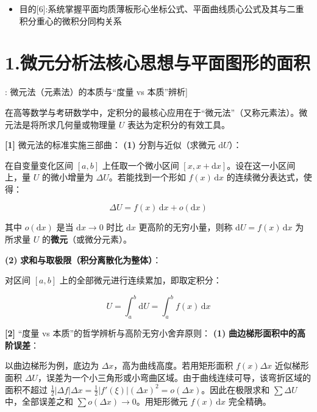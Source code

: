\documentclass[11pt,a4paper,UTF8]{ctexart}
\begin{document}
\begin{targetbox}[本章复习目标与核心知识图谱]
\begin{itemize}
  \item 目的[6]:系统掌握平面均质薄板形心坐标公式、平面曲线质心公式及其与二重积分重心的微积分同构关系
\end{itemize}
\end{targetbox}


\section{1.微元分析法核心思想与平面图形的面积}

\begin{thmbox}[方法[1]: 微元法（元素法）的本质与“度量 vs 本质”辨析]

在高等数学与考研数学中，定积分的最核心应用在于“微元法”（又称元素法）。微元法是将所求几何量或物理量 $U$ 表达为定积分的有效工具。

\textbf{[1]} 微元法的标准实施三部曲：
\textbf{(1)}  \textit{}分割与近似（求微元 $\mathrm{d}U$）\textit{}：

在自变量变化区间 $[a, b]$ 上任取一个微小区间 $[x, x + \mathrm{d}x]$。设在这一小区间上，量 $U$ 的微小增量为 $\Delta U$。若能找到一个形如 $f(x)\,\mathrm{d}x$ 的连续微分表达式，使得：


\begin{equation*}
\Delta U = f(x)\,\mathrm{d}x + o(\mathrm{d}x)
\end{equation*}


其中 $o(\mathrm{d}x)$ 是当 $\mathrm{d}x \to 0$ 时比 $\mathrm{d}x$ 更高阶的无穷小量，则称 $\mathrm{d}U = f(x)\,\mathrm{d}x$ 为所求量 $U$ 的\textbf{微元}（或微分元素）。

\textbf{(2)}  \textbf{求和与取极限（积分离散化为整体）}：

对区间 $[a, b]$ 上的全部微元进行连续累加，即取定积分：


\begin{equation*}
U = \int_a^b \mathrm{d}U = \int_a^b f(x)\,\mathrm{d}x
\end{equation*}


\textbf{[2]} “度量 vs 本质”的哲学辨析与高阶无穷小舍弃原则：
\textbf{(1)}  \textbf{曲边梯形面积中的高阶误差}：

以曲边梯形为例，底边为 $\Delta x$，高为曲线高度。若用矩形面积 $f(x)\Delta x$ 近似梯形面积 $\Delta U$，误差为一个小三角形或小弯曲区域。由于曲线连续可导，该弯折区域的面积不超过 $\frac{1}{2}|\Delta f|\Delta x = \frac{1}{2}|f'(\xi)|(\Delta x)^2 = o(\Delta x)$。因此在极限求和 $\sum \Delta U$ 中，全部误差之和 $\sum o(\Delta x) \to 0$。用矩形微元 $f(x)\,\mathrm{d}x$ 完全精确。


\end{thmbox}
\end{document}
